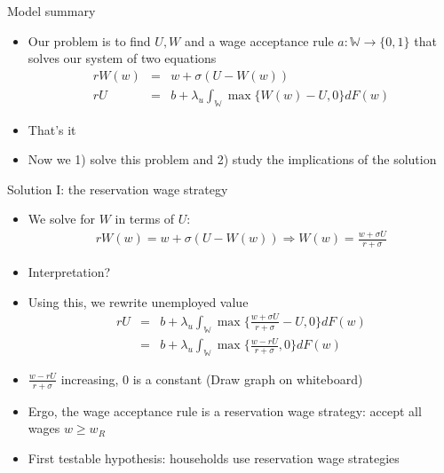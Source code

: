 \documentclass[9pt]{beamer}
\newcommand{\bit}{\begin{itemize}}
\newcommand{\eit}{\end{itemize}}
\newcommand{\bc}{\color{blue}}
\newcommand{\rc}{\color{red}}
\begin{document}
\begin{frame}{Model summary}

\bit
\setlength\itemsep{2em}

\item Our problem is to find $U,W$ and a wage acceptance rule $a: \mathds{W} \rightarrow \{0,1\}$ that solves our system of two equations
\begin{eqnarray}
r W(w) &=& w + \sigma (U-W(w)) \nonumber \\ 
rU  &=&  b + \lambda_u  \int_{\mathds{W}} \max\{W(w)-U, 0\} dF(w) \nonumber
\end{eqnarray}
\item That's it

\item Now we 1) solve this problem and 2) study the implications of the solution

\eit
\end{frame}

\begin{frame}{Solution I: the reservation wage strategy}

\bit
\setlength\itemsep{1em}

\item We solve for $W$ in terms of $U$:
\begin{eqnarray}
r W(w) = w + \sigma (U-W(w))  \Rightarrow W(w) = \frac{w+\sigma U}{r+\sigma} \nonumber 
\end{eqnarray}
\item Interpretation?

\item Using this, we rewrite unemployed value
\begin{eqnarray}
rU  &=& b + \lambda_u  \int_{\mathds{W}} \max\{\frac{w+\sigma U}{r+\sigma}-U, 0\} dF(w) \nonumber \\
&=& b + \lambda_u  \int_{\mathds{W}} \max\{\frac{w-r U}{r+\sigma}, 0\} dF(w)  \nonumber
\end{eqnarray}

\item $\frac{w-r U}{r+\sigma}$ increasing, $0$ is a constant {\rc(Draw graph on whiteboard)}

\item Ergo, the wage acceptance rule is a reservation wage strategy: accept all wages $w \geq w_R$

\item First testable hypothesis: households use {\bc reservation wage strategies}

\eit


\end{frame}
\end{document}
